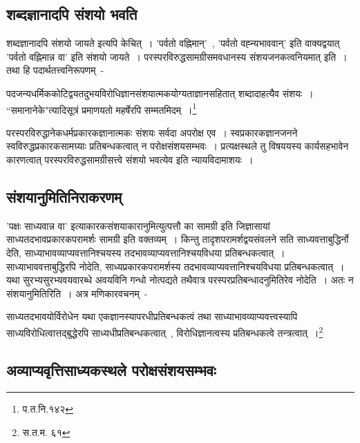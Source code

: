 		\subsection{शब्दज्ञानादपि संशयो भवति}

		शब्दज्ञानादपि संशयो जायते इत्यपि केचित्~। 'पर्वतो वह्निमान्'~, 'पर्वतो वह्न्यभाववान्' इति वाक्यद्वयात् 'पर्वतो वह्निमान्न वा' इति संशयो जायते~। परस्परविरुद्धसामग्रीसमवधानस्य संशयजनकत्वनियमात् इति~। तथा हि पदार्थतत्त्वनिरूपणम्~-

		{\fontsize{11.7}{0}\selectfont\s पदजन्यधर्मिककोटिद्वयतदुभयविरोधिज्ञानसंशयात्मकयोग्यताज्ञानसहितात् शब्दादाहत्यैव संशयः~। “समानानेके"त्यादिसूत्रं प्रमाणयतो महर्षेरपि सम्मतमिदम्~।\footnote{प.त.नि.१४२}}


	परस्परविरुद्धानेकधर्मप्रकारकज्ञानात्मकः संशयः सर्वदा अपरोक्ष एव~। स्वप्रकारकज्ञानजनने स्वविरुद्धप्रकारकसामग्र्याः प्रतिबन्धकत्वात् न परोक्षसंशयसम्भवः~। प्रत्यक्षस्थले तु विषययस्य कार्यसहभावेन कारणत्वात् परस्परविरुद्धसामग्रीसत्त्वे संशयो भवत्येव इति न्यायविदामाशयः~।

		\subsection{संशयानुमितिनिराकरणम्}

		'पक्षः साध्यवान्न वा' इत्याकारकसंशयाकारानुमित्युत्पत्तौ का सामग्री इति जिज्ञासायां साध्यतदभावप्रकारकपरामर्शः सामग्री इति वक्तव्यम्~। किन्तु तादृशपरामर्शद्वयसंवलने सति साध्यवत्ताबुद्धिर्नो देति, साध्याभावव्याप्यवत्तानिश्चयस्य तदभावव्याप्यवत्तानिश्चयविधया प्रतिबन्धकत्वात्~। साध्याभाववत्ताबुद्धिरपि नोदेति, साध्यप्रकारकपरामर्शस्य तदभावव्याप्यवत्तानिश्चयविधया प्रतिबन्धकत्वात्~। यथा सुरभ्यसुरभ्यवयवारब्धे अवयविनि गन्धो नोत्पद्यते तथैवात्र परस्परप्रतिबन्धादनुमितिरेव नोदेति~। अतः न संशयानुमितिरिति~। अत्र मणिकारवचनम्~-

		{\fontsize{11.7}{0}\selectfont\s साध्यतदभावयोर्विरोधेन यथा एकज्ञानस्यापरधीप्रतिबन्धकत्वं तथा साध्याभावव्याप्यवत्त्वस्यापि साध्यविरोधित्वात्तद्बुद्धेरपि साध्यधीप्रतिबन्धकत्वात्~, विरोधिज्ञानत्वस्य प्रतिबन्धकत्वे तन्त्रत्वात्~।\footnote{स.त.म. ६१}}

		\subsection{अव्याप्यवृत्तिसाध्यकस्थले परोक्षसंशयसम्भवः}

